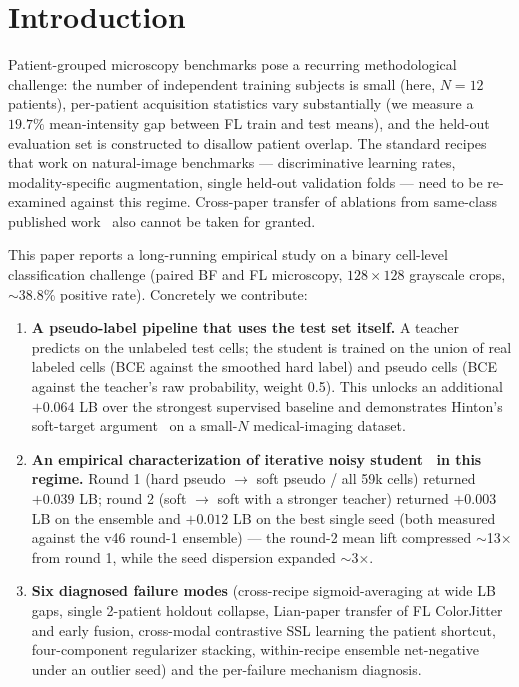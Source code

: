 \documentclass[conference]{IEEEtran}
\begin{document}
\section{Introduction}
\label{sec:intro}

Patient-grouped microscopy benchmarks pose a recurring methodological challenge: the number of independent training subjects is small (here, $N=12$ patients), per-patient acquisition statistics vary substantially (we measure a $19.7\%$ mean-intensity gap between FL train and test means), and the held-out evaluation set is constructed to disallow patient overlap. The standard recipes that work on natural-image benchmarks --- discriminative learning rates, modality-specific augmentation, single held-out validation folds --- need to be re-examined against this regime. Cross-paper transfer of ablations from same-class published work~\cite{lian2024cafnet} also cannot be taken for granted.

This paper reports a long-running empirical study on a binary cell-level classification challenge (paired BF and FL microscopy, $128 \times 128$ grayscale crops, $\sim$38.8\% positive rate). Concretely we contribute:

\begin{enumerate}
  \item \textbf{A pseudo-label pipeline that uses the test set itself.} A teacher predicts on the unlabeled test cells; the student is trained on the union of real labeled cells (BCE against the smoothed hard label) and pseudo cells (BCE against the teacher's raw probability, weight 0.5). This unlocks an additional $+0.064$ LB over the strongest supervised baseline and demonstrates Hinton's soft-target argument~\cite{hinton2015distilling} on a small-$N$ medical-imaging dataset.
  \item \textbf{An empirical characterization of iterative noisy student~\cite{xie2020noisystudent} in this regime.} Round 1 (hard pseudo $\rightarrow$ soft pseudo / all 59k cells) returned $+0.039$ LB; round 2 (soft $\rightarrow$ soft with a stronger teacher) returned $+0.003$ LB on the ensemble and $+0.012$ LB on the best single seed (both measured against the v46 round-1 ensemble) --- the round-2 mean lift compressed $\sim$13$\times$ from round 1, while the seed dispersion expanded $\sim$3$\times$.
  \item \textbf{Six diagnosed failure modes} (cross-recipe sigmoid-averaging at wide LB gaps, single 2-patient holdout collapse, Lian-paper transfer of FL ColorJitter and early fusion, cross-modal contrastive SSL learning the patient shortcut, four-component regularizer stacking, within-recipe ensemble net-negative under an outlier seed) and the per-failure mechanism diagnosis.
\end{enumerate}
\end{document}
